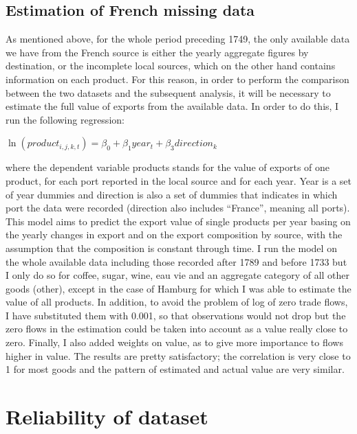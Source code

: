 \documentclass[12pt,a4paper,titlepage,english]{article}
\begin{document}
\subsection{Estimation of French missing data} \label{french_estimation}
As mentioned above, for the whole period preceding 1749, the only available data we have from the French source is either the yearly aggregate figures by destination, or the incomplete local sources, which on the other hand contains information on each product. For this reason, in order to perform the comparison between the two datasets and the subsequent analysis, it will be necessary to estimate the full value of exports from the available data. In order to do this, I run the following regression:
\begin{center}
$\ln(product_{i,j,k,t})=\beta_0 + \beta_1year_t+\beta_3direction_k$
\end{center}
where the dependent variable products stands for the value of exports of one product, for each port reported in the local source and for each year. Year is a set of year dummies and direction is also a set of dummies that indicates in which port the data were recorded (direction also includes “France”, meaning all ports). This model aims to predict the export value of single products per year basing on the yearly changes in export and on the export composition by source, with the assumption that the composition is constant through time. I run the model on the whole available data including those recorded after 1789 and before 1733 but I only do so for coffee, sugar, wine, eau vie and an aggregate category of all other goods (other), except in the case of Hamburg for which I was able to estimate the value of all products. In addition, to avoid the problem of log of zero trade flows, I have substituted them with 0.001, so that observations would not drop but the zero flows in the estimation could be taken into account as a value really close to zero. Finally, I also added weights on value, as to give more importance to flows higher in value. The results are pretty satisfactory; the correlation is very close to 1 for most goods and the pattern of estimated and actual value are very similar. 



\section{Reliability of dataset}
\end{document}

